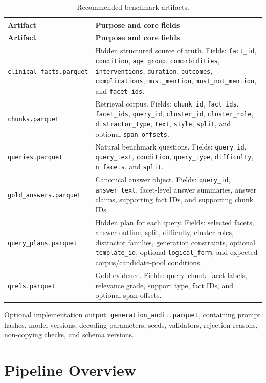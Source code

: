 \documentclass[11pt,a4paper]{article}
\newcommand{\field}[1]{\texttt{#1}}
\begin{document}
\begin{longtable}{p{4.9cm}p{10.1cm}}
	\caption{Recommended benchmark artifacts.}\\
	\toprule
	\textbf{Artifact} & \textbf{Purpose and core fields}\\
	\midrule
	\endfirsthead
	\toprule
	\textbf{Artifact} & \textbf{Purpose and core fields}\\
	\midrule
	\endhead
	\bottomrule
	\endfoot
	\field{clinical\_facts.parquet} & Hidden structured source of truth. Fields: \field{fact\_id}, \field{condition}, \field{age\_group}, \field{comorbidities}, \field{interventions}, \field{duration}, \field{outcomes}, \field{complications}, \field{must\_mention}, \field{must\_not\_mention}, and \field{facet\_ids}.\\
	\field{chunks.parquet} & Retrieval corpus. Fields: \field{chunk\_id}, \field{fact\_ids}, \field{facet\_ids}, \field{query\_id}, \field{cluster\_id}, \field{cluster\_role}, \field{distractor\_type}, \field{text}, \field{style}, \field{split}, and optional \field{span\_offsets}.\\
	\field{queries.parquet} & Natural benchmark questions. Fields: \field{query\_id}, \field{query\_text}, \field{condition}, \field{query\_type}, \field{difficulty}, \field{n\_facets}, and \field{split}.\\
	\field{gold\_answers.parquet} & Canonical answer object. Fields: \field{query\_id}, \field{answer\_text}, facet-level answer summaries, answer claims, supporting fact IDs, and supporting chunk IDs.\\
	\field{query\_plans.parquet} & Hidden plan for each query. Fields: selected facets, answer outline, split, difficulty, cluster roles, distractor families, generation constraints, optional \field{template\_id}, optional \field{logical\_form}, and expected corpus/candidate-pool conditions.\\
	\field{qrels.parquet} & Gold evidence. Fields: query--chunk--facet labels, relevance grade, support type, fact IDs, and optional span offsets.\\
\end{longtable}

Optional implementation output: \field{generation\_audit.parquet}, containing prompt hashes, model versions, decoding parameters, seeds, validators, rejection reasons, non-copying checks, and schema versions.

\section{Pipeline Overview}
\end{document}
